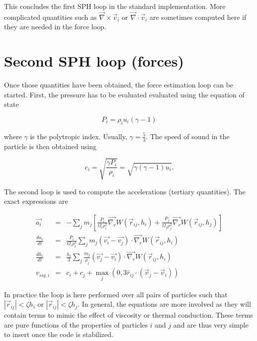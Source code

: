 \documentclass[a4paper,10pt]{report}
\begin{document}
This concludes the first SPH loop in the standard implementation. More complicated quantities such as
$\vec\nabla\times\vec v_i$ or $\vec\nabla\cdot\vec v_i$ are sometimes computed here if they are needed in the force
loop.

\section{Second SPH loop (forces)}
\label{sec:forces}

Once those quantities have been obtained, the force estimation loop can be started.
First, the pressure has to be evaluated evaluated using the equation of state

\begin{equation}
\label{eq:pressure}
 P_i = \rho_i u_i (\gamma - 1)
\end{equation}

where $\gamma$ is the polytropic index. Usually, $\gamma = \frac{5}{3}$. The speed of sound in the particle is then
obtained using

\begin{equation}
 c_i = \sqrt{\frac{\gamma P_i}{\rho_i}} = \sqrt{\gamma (\gamma-1)u_i}.
\end{equation}

The second loop is used to compute the accelerations (tertiary quantities). The exact expressions are

\begin{eqnarray}
 \vec{a_i} &=& - \sum_j m_j\left[\frac{P_i}{\Omega_i\rho_i^2}\vec{\nabla_r} W(\vec{r}_{ij}, h_i) +
\frac{P_j}{\Omega_j\rho_j^2}\vec{\nabla_r}W(\vec{r}_{ij}, h_j) \right] \label{eq:acceleration}\\
 \frac{du_i}{dt} &=& \frac{P_i}{\Omega_i\rho_i^2} \sum_j m_j
(\vec{v_i}-\vec{v_j})\cdot\vec{\nabla_r} W(\vec{r}_{ij}, h_i)
\label{eq:dudt}\\
 \frac{dh_i}{dt} &=& \frac{h_i}{3}\sum_j \frac{m_j}{\rho_j} \left(\vec{v_j} - \vec{v_i} \right)
\cdot\vec{\nabla_r}W(\vec{r}_{ij}, h_i)\\
 v_{sig,i} &=& c_i + c_j + \max_j(0, 3\hat{r}_{ij} \cdot (\vec{v}_j - \vec{v}_i))
\end{eqnarray}

In practice the loop is here performed over all pairs of particles such that $|\vec{r}_{ij}| < \zeta h_i$ or
$|\vec{r}_{ij}| < \zeta
h_j$. In general, the equations are more involved as they will contain terms to mimic the effect of viscosity or
thermal conduction. These terms are pure functions of the properties of particles $i$ and $j$ and are thus very simple
to insert once the code is stabilized.\\
\end{document}
